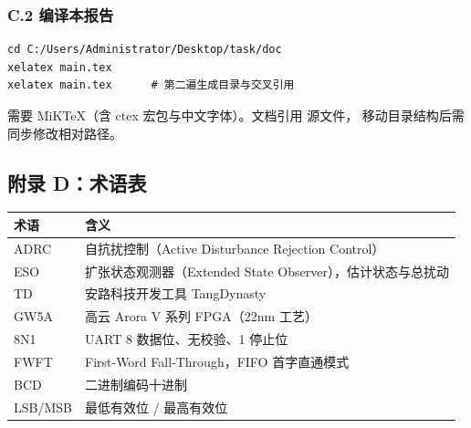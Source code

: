 \subsubsection{C.2 编译本报告}

\begin{lstlisting}[style=cfgcode,numbers=none]
cd C:/Users/Administrator/Desktop/task/doc
xelatex main.tex
xelatex main.tex      # 第二遍生成目录与交叉引用
\end{lstlisting}

需要 MiKTeX（含 ctex 宏包与中文字体）。文档引用  源文件，
移动目录结构后需同步修改相对路径。

\subsection{附录 D：术语表}

\begin{table}[htbp]
\centering
\small
\begin{tabular}{ll}
\toprule
术语 & 含义\\
\midrule
ADRC & 自抗扰控制（Active Disturbance Rejection Control）\\
ESO & 扩张状态观测器（Extended State Observer），估计状态与总扰动\\
TD & 安路科技开发工具 TangDynasty\\
GW5A & 高云 Arora V 系列 FPGA（22nm 工艺）\\
8N1 & UART 8 数据位、无校验、1 停止位\\
FWFT & First-Word Fall-Through，FIFO 首字直通模式\\
BCD & 二进制编码十进制\\
LSB/MSB & 最低有效位 / 最高有效位\\
\bottomrule
\end{tabular}
\end{table}
